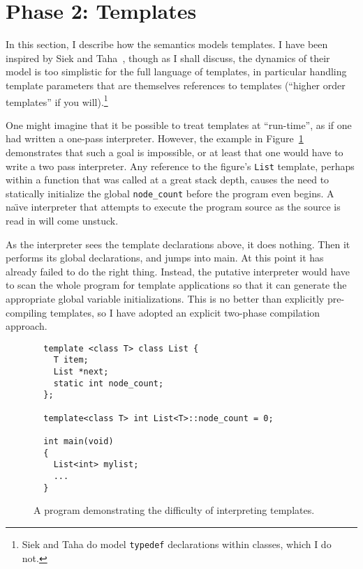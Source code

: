 \documentclass[11pt]{article}
\newcommand{\naive}{na\"\i{}ve}
\begin{document}
\section{Phase 2: Templates}
\label{sec:templates}

In this section, I describe how the semantics models templates.  I
have been inspired by Siek and Taha~\cite{DBLP:conf/ecoop/SiekT06},
though as I shall discuss, the dynamics of their model is too
simplistic for the full language of templates, in particular handling
template parameters that are themselves references to templates
(``higher order templates'' if you will).\footnote{Siek and Taha do
  model \texttt{typedef} declarations within classes, which I do not.}

One might imagine that it be possible to treat templates at
``run-time'', as if one had written a one-pass \cpp{} interpreter.
However, the example in Figure~\ref{fig:templates-not-interpretable}
demonstrates that such a goal is impossible, or at least that one
would have to write a two pass interpreter.  Any reference to the
figure's \texttt{List} template, perhaps within a function that was
called at a great stack depth, causes the need to statically
initialize the global \texttt{node\_count} before the program even
begins.  A \naive{} interpreter that attempts to execute the program
source as the source is read in will come unstuck.

As the interpreter sees the template declarations above, it does
nothing.  Then it performs its global declarations, and jumps into
main.  At this point it has already failed to do the right thing.
Instead, the putative interpreter would have to scan the whole program
for template applications so that it can generate the appropriate
global variable initializations.  This is no better than explicitly
pre-compiling templates, so I have adopted an explicit two-phase
compilation approach.

\begin{figure}
\begin{verbatim}
  template <class T> class List {
    T item;
    List *next;
    static int node_count;
  };

  template<class T> int List<T>::node_count = 0;

  int main(void)
  {
    List<int> mylist;
    ...
  }
\end{verbatim}
  \caption[A Difficult Program for Template Interpretation]{A program
    demonstrating the difficulty of interpreting templates.}
\label{fig:templates-not-interpretable}
\end{figure}
\end{document}
